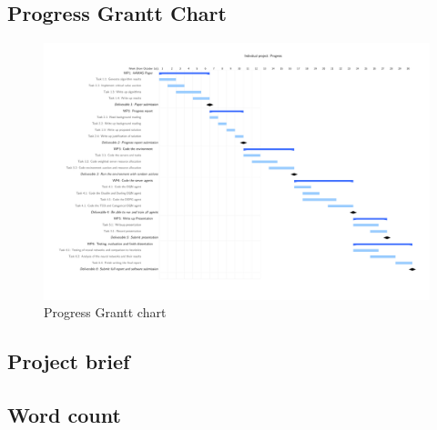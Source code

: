 \subsection*{Progress Grantt Chart}
\begin{figure}[h]
    \centering
    \includegraphics[width=\linewidth]{extra/progress_grantt_chart.pdf}
    \caption{Progress Grantt chart}
    \label{fig:progress_grant_chart}
\end{figure}

\subsection*{Project brief}


\subsection*{Word count}
\wordcount
